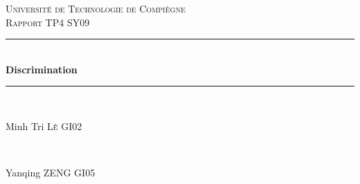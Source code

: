 \documentclass{article}
\begin{document}
\begin{titlepage}

\newcommand{\HRule}{\rule{\linewidth}{0.5mm}} %

\center %
 

\textsc{\LARGE Université de Technologie de Compiègne}\\[1.5cm] %
\textsc{\Large Rapport TP4 SY09}\\[0.5cm] %


\HRule \\[0.4cm]
{ \huge \bfseries Discrimination}\\[0.4cm] %
\HRule \\[1.5cm]
 

\begin{minipage}{0.4\textwidth}
\begin{flushleft} \large
Minh Tri \textsc{Lê} GI02 %
\end{flushleft}
\end{minipage}
~
\begin{minipage}{0.4\textwidth}
\begin{flushright} \large
Yanqing \textsc{ZENG} GI05%
\\
\end{flushright}
\end{minipage}\\[2cm]




\end{titlepage}
\end{document}
